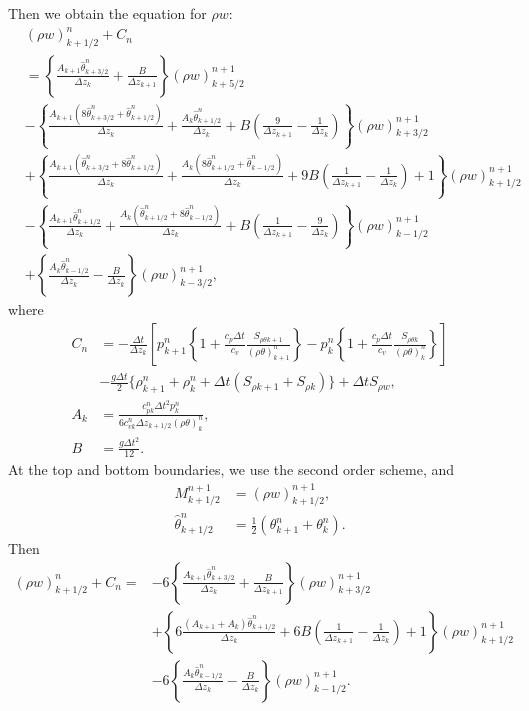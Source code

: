 Then we obtain the equation for $\rho w$:
\begin{align}
  & (\rho w)_{k+1/2}^n + C_n \\
  &= \left\{\frac{A_{k+1}\hat\theta_{k+3/2}^n}{\Delta z_k} + \frac{B}{\Delta z_{k+1}}\right\} (\rho w)_{k+5/2}^{n+1} \nonumber \\
  &- \left\{\frac{A_{k+1}(8\hat\theta_{k+3/2}^n+\hat\theta_{k+1/2}^n)}{\Delta z_k} + \frac{A_{k}\hat\theta_{k+1/2}^n}{\Delta z_k} + B\left(\frac{9}{\Delta z_{k+1}}-\frac{1}{\Delta z_k}\right)\right\} (\rho w)_{k+3/2}^{n+1} \nonumber \\
  &+ \left\{\frac{A_{k+1}(\hat\theta_{k+3/2}^n+8\hat\theta_{k+1/2}^n)}{\Delta z_k} + \frac{A_k(8\hat\theta_{k+1/2}^n+\hat\theta_{k-1/2}^n)}{\Delta z_k} + 9B\left(\frac{1}{\Delta z_{k+1}}-\frac{1}{\Delta z_k}\right) + 1\right\} (\rho w)_{k+1/2}^{n+1} \nonumber \\
  &- \left\{\frac{A_{k+1}\hat\theta_{k+1/2}^n}{\Delta z_k} + \frac{A_k(\hat\theta_{k+1/2}^n+8\hat\theta_{k-1/2}^n)}{\Delta z_k} + B\left(\frac{1}{\Delta z_{k+1}}-\frac{9}{\Delta z_k}\right)\right\} (\rho w)_{k-1/2}^{n+1} \nonumber \\
  &+ \left\{\frac{A_k\hat\theta_{k-1/2}^n}{\Delta z_k} - \frac{B}{\Delta z_k}\right\} (\rho w)_{k-3/2}^{n+1},
\end{align}
where
\begin{align}
  C_n
  &= -\frac{\Delta t}{\Delta z_k}\left[
    p_{k+1}^n\left\{1+\frac{c_p\Delta t}{c_v}\frac{S_{\rho\theta k+1}}{(\rho\theta)_{k+1}^n}\right\}
  - p_k^n   \left\{1+\frac{c_p\Delta t}{c_v}\frac{S_{\rho\theta k}  }{(\rho\theta)_k^n   }\right\}
    \right] \nonumber \\
  &-\frac{g\Delta t}{2}\{\rho_{k+1}^n+\rho_k^n+\Delta t(S_{\rho k+1}+S_{\rho k})\}
  + \Delta t S_{\rho w}, \\
  A_k &= \frac{c_{p k}^n\Delta t^2 p_k^n   }{6c_{v k}^n\Delta z_{k+1/2} (\rho\theta)_k^n}, \\
  B &= \frac{g\Delta t^2}{12}.
\end{align}
At the top and bottom boundaries,
we use the second order scheme,
and
\begin{align}
  M_{k+1/2}^{n+1} &= (\rho w)_{k+1/2}^{n+1}, \\
  \hat\theta_{k+1/2}^n &= \frac{1}{2}(\theta_{k+1}^n+\theta_k^n).
\end{align}
Then
\begin{align}
  (\rho w)_{k+1/2}^n + C_n =
  &- 6\left\{\frac{A_{k+1}\hat\theta_{k+3/2}^n}{\Delta z_k} + \frac{B}{\Delta z_{k+1}}\right\} (\rho w)_{k+3/2}^{n+1} \nonumber \\
  &+ \left\{6\frac{(A_{k+1}+A_k)\hat\theta_{k+1/2}^n}{\Delta z_k} + 6B\left(\frac{1}{\Delta z_{k+1}}-\frac{1}{\Delta z_k}\right) + 1\right\} (\rho w)_{k+1/2}^{n+1} \nonumber \\
  &- 6\left\{\frac{A_k\hat\theta_{k-1/2}^n}{\Delta z_k} - \frac{B}{\Delta z_k}\right\} (\rho w)_{k-1/2}^{n+1}.
\end{align}


